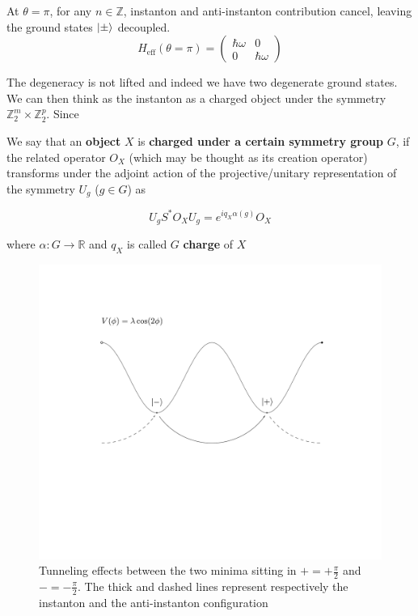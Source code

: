 At $\theta= \pi$, for any $n \in \mathbb{Z}$, instanton and anti-instanton contribution cancel, leaving the ground states $\ket{\pm}$ decoupled. 
\begin{equation}
    H_{\text{eff}}(\theta=\pi)
= \begin{pmatrix}
 \hbar \omega &0 \\
 0  &\hbar \omega
    \end{pmatrix}
    \end{equation}

The degeneracy is not lifted and indeed we have two degenerate ground states. We can then think as the instanton as a charged object under the symmetry $\mathbb{Z}_2^m \times \mathbb{Z}_2^p$. Since 

\begin{Jargon}{}{}
We say that an \textbf{object} $X$ is \textbf{charged under a certain symmetry group} $G$, if the related operator $O_X$ (which may be thought as its creation operator) transforms under the adjoint action of the projective/unitary representation of the symmetry $U_g$ ($g \in G$) as

\begin{equation}
    U_g S^{*} O_X U_g = e^{i q_X \alpha(g)} O_X 
\end{equation}

where $\alpha: G \to \mathbb{R}$ and $q_X$ is called $G$ \textbf{charge} of $X$
\end{Jargon}

\begin{figure}[H]
	\centering
   	\includegraphics[trim={0cm 10cm 0cm 4cm}, clip, width=\textwidth]{instanton.pdf}
  	\caption{Tunneling effects between the two minima sitting in $+ = + \frac{\pi}{2}$ and $- = - \frac{\pi}{2}$. The thick and dashed lines represent respectively the instanton and the anti-instanton configuration}
   	\label{inst}
\end{figure}

